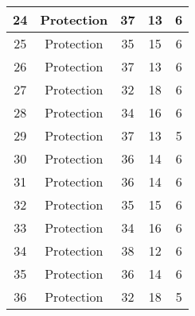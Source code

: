 \documentclass[results.tex]{subfiles}
\begin{document}
\begin{center}
\begin{tabular}{| c || c | c | c | c |}
            \hline
            24                      & Protection                   & 37                     & 13                      & 6                    \\
            \hline
            25                      & Protection                   & 35                     & 15                      & 6                    \\
            \hline
            26                      & Protection                   & 37                     & 13                      & 6                    \\
            \hline
            27                      & Protection                   & 32                     & 18                      & 6                    \\
            \hline
            28                      & Protection                   & 34                     & 16                      & 6                    \\
            \hline
            29                      & Protection                   & 37                     & 13                      & 5                    \\
            \hline
            30                      & Protection                   & 36                     & 14                      & 6                    \\
            \hline
            31                      & Protection                   & 36                     & 14                      & 6                    \\
            \hline
            32                      & Protection                   & 35                     & 15                      & 6                    \\
            \hline
            33                      & Protection                   & 34                     & 16                      & 6                    \\
            \hline
            34                      & Protection                   & 38                     & 12                      & 6                    \\
            \hline
            35                      & Protection                   & 36                     & 14                      & 6                    \\
            \hline
            36                      & Protection                   & 32                     & 18                      & 5                    \\

\end{tabular}
\end{center}
\end{document}
